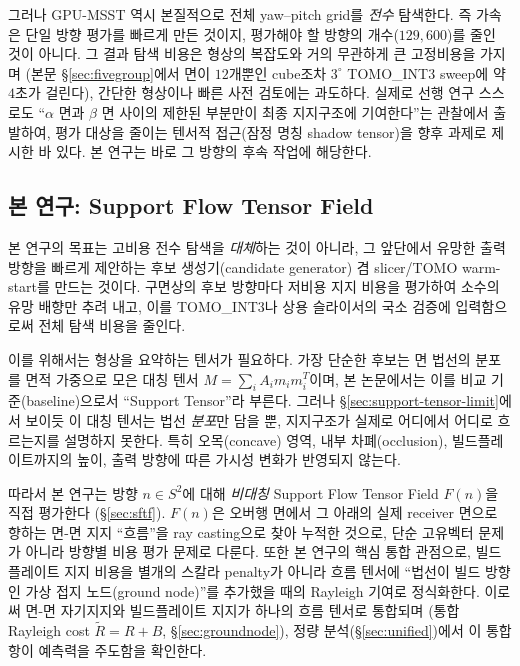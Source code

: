 \documentclass[11pt,a4paper]{article}
\begin{document}
그러나 GPU-MSST 역시 본질적으로 전체 yaw--pitch grid를 \emph{전수} 탐색한다.
즉 가속은 단일 방향 평가를 빠르게 만든 것이지, 평가해야 할 방향의 개수($129{,}600$)를 줄인 것이 아니다.
그 결과 탐색 비용은 형상의 복잡도와 거의 무관하게 큰 고정비용을 가지며
(본문 \S\ref{sec:fivegroup}에서 면이 $12$개뿐인 cube조차 $3^\circ$ TOMO\_INT3 sweep에 약 $4$초가 걸린다),
간단한 형상이나 빠른 사전 검토에는 과도하다.
실제로 선행 연구 스스로도 ``$\alpha$ 면과 $\beta$ 면 사이의 제한된 부분만이 최종 지지구조에 기여한다''는
관찰에서 출발하여, 평가 대상을 줄이는 텐서적 접근(잠정 명칭 shadow tensor)을 향후 과제로 제시한 바 있다.
본 연구는 바로 그 방향의 후속 작업에 해당한다.

\subsection{본 연구: Support Flow Tensor Field}

본 연구의 목표는 고비용 전수 탐색을 \emph{대체}하는 것이 아니라,
그 앞단에서 유망한 출력 방향을 빠르게 제안하는 후보 생성기(candidate generator) 겸
slicer/TOMO warm-start를 만드는 것이다.
구면상의 후보 방향마다 저비용 지지 비용을 평가하여 소수의 유망 배향만 추려 내고,
이를 TOMO\_INT3나 상용 슬라이서의 국소 검증에 입력함으로써 전체 탐색 비용을 줄인다.

이를 위해서는 형상을 요약하는 텐서가 필요하다.
가장 단순한 후보는 면 법선의 분포를 면적 가중으로 모은 대칭 텐서
$M=\sum_i A_i m_i m_i^T$이며, 본 논문에서는 이를 비교 기준(baseline)으로서 ``Support Tensor''라 부른다.
그러나 \S\ref{sec:support-tensor-limit}에서 보이듯 이 대칭 텐서는 법선 \emph{분포}만 담을 뿐,
지지구조가 실제로 어디에서 어디로 흐르는지를 설명하지 못한다.
특히 오목(concave) 영역, 내부 차폐(occlusion), 빌드플레이트까지의 높이,
출력 방향에 따른 가시성 변화가 반영되지 않는다.

따라서 본 연구는 방향 $n\in S^2$에 대해 \emph{비대칭} Support Flow Tensor Field $F(n)$을 직접 평가한다
(\S\ref{sec:sftf}).
$F(n)$은 오버행 면에서 그 아래의 실제 receiver 면으로 향하는 면-면 지지 ``흐름''을
ray casting으로 찾아 누적한 것으로, 단순 고유벡터 문제가 아니라 방향별 비용 평가 문제로 다룬다.
또한 본 연구의 핵심 통합 관점으로, 빌드플레이트 지지 비용을 별개의 스칼라 penalty가 아니라
흐름 텐서에 ``법선이 빌드 방향인 가상 접지 노드(ground node)''를 추가했을 때의 Rayleigh 기여로 정식화한다.
이로써 면-면 자기지지와 빌드플레이트 지지가 하나의 흐름 텐서로 통합되며
(통합 Rayleigh cost $\tilde R=R+B$, \S\ref{sec:groundnode}),
정량 분석(\S\ref{sec:unified})에서 이 통합 항이 예측력을 주도함을 확인한다.
\end{document}
